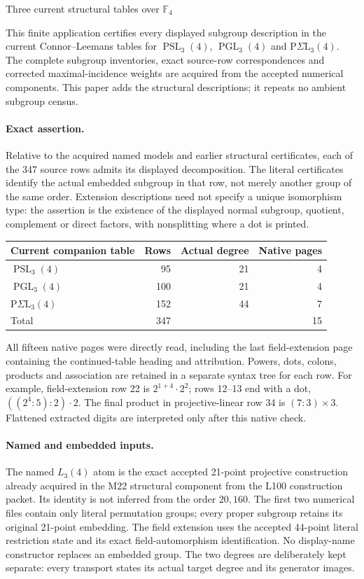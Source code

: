 \documentclass[11pt]{article}
\newcommand{\PSL}{\operatorname{PSL}}
\newcommand{\PGL}{\operatorname{PGL}}
\begin{document}
\begin{center}\Large Three current structural tables over $\mathbb F_4$\end{center}
\noindent This finite application certifies every displayed subgroup description
in the current Connor--Leemans tables for $\PSL_3(4)$, $\PGL_3(4)$ and
$\mathrm P\Sigma\mathrm L_3(4)$. The complete subgroup inventories, exact
source-row correspondences and corrected maximal-incidence weights are
acquired from the accepted numerical components. This paper adds the
structural descriptions; it repeats no ambient subgroup census.

\paragraph{Exact assertion.}
Relative to the acquired named models and earlier structural certificates,
each of the 347 source rows admits its displayed decomposition. The literal
certificates identify the actual embedded subgroup in that row, not merely
another group of the same order. Extension descriptions need not specify a
unique isomorphism type: the assertion is the existence of the displayed
normal subgroup, quotient, complement or direct factors, with nonsplitting
where a dot is printed.
\begin{center}
\begin{tabular}{lrrr}\toprule
Current companion table&Rows&Actual degree&Native pages\\\midrule
$\PSL_3(4)$&95&21&4\\
$\PGL_3(4)$&100&21&4\\
$\mathrm P\Sigma\mathrm L_3(4)$&152&44&7\\\midrule
Total&347&&15\\\bottomrule
\end{tabular}
\end{center}
All fifteen native pages were directly read, including the last field-extension
page containing the continued-table heading and attribution. Powers, dots,
colons, products and association are retained in a separate syntax tree for
each row. For example, field-extension row 22 is $2^{1+4}\mathbin{\cdot}2^2$;
rows 12--13 end with a dot, $( (2^4:5):2)\mathbin{\cdot}2$.
The final product in projective-linear row 34 is $(7:3)\times3$.
Flattened extracted digits are interpreted only after this native check.

\paragraph{Named and embedded inputs.}
The named $L_3(4)$ atom is the exact accepted 21-point projective construction
already acquired in the M22 structural component from the L100 construction
packet. Its identity is not inferred from the order $20,160$.
The first two numerical files contain only literal permutation groups;
every proper subgroup retains its original 21-point embedding. The field
extension uses the accepted 44-point literal restriction state and its exact
field-automorphism identification. No display-name constructor replaces an
embedded group. The two degrees are deliberately kept separate: every
transport states its actual target degree and its generator images.
\end{document}
